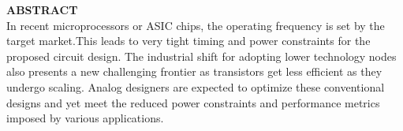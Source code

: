 \centering \textbf{ABSTRACT}\\
\justify
\skipspace
In recent microprocessors or ASIC chips, the operating frequency is set by the target market.This leads to very tight timing and power constraints for the proposed circuit design. The industrial shift  for adopting lower technology nodes also presents a new challenging frontier as transistors get less efficient as they undergo scaling. Analog designers are expected to optimize  these conventional designs and yet meet the reduced power constraints and performance metrics imposed by various applications.

\newpage
